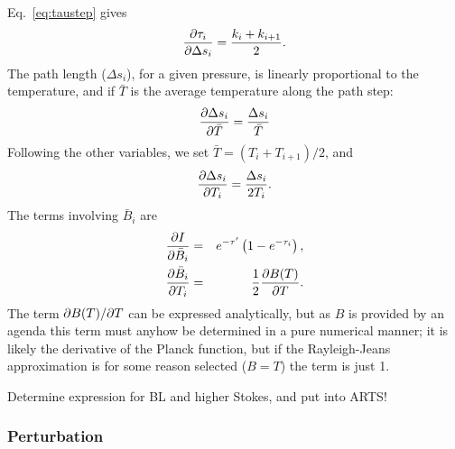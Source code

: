 Eq.~\ref{eq:taustep} gives
\begin{equation}
  \frac{\partial \tau_{i}}{\partial \Delta s_i} = \frac{k_i+k_{i+1}}{2}. 
\end{equation}
The path length ($\Delta s_i$), for a given pressure, is linearly proportional
to the temperature, and if $\bar{T}$ is the average temperature along the path
step:
\begin{equation}
  \frac{\partial \Delta s_i}{\partial \bar{T}} =   \frac{\Delta s_i}{\bar{T}} 
\end{equation}
Following the other variables, we set $\bar{T}=(T_i+T_{i+1})/2$, and
\begin{equation}
  \frac{\partial \Delta s_i}{\partial T_i} = \frac{\Delta s_i}{2T_i}.
\end{equation}
The terms involving $\bar{B}_i$ are
\begin{eqnarray}
   \frac{\partial I}{\partial \bar{B}_i} &=&
   e^{-\tau'}\left(1-e^{-\tau_{i}}\right), \\
   \frac{\partial \bar{B}_i}{\partial T_i} &=& \frac{1}{2}
   \frac{\partial B(T)}{\partial T}. 
\end{eqnarray}
The term $\partial B(T)/\partial T$ can be expressed analytically, but as $B$ is
provided by an agenda this term must anyhow be determined in a pure numerical
manner; it is likely the derivative of the Planck function, but if the
Rayleigh-Jeans approximation is for some reason selected ($B=T$) the term 
is just 1.

Determine expression for BL and higher Stokes, and put into ARTS!

\subsubsection{Perturbation}
